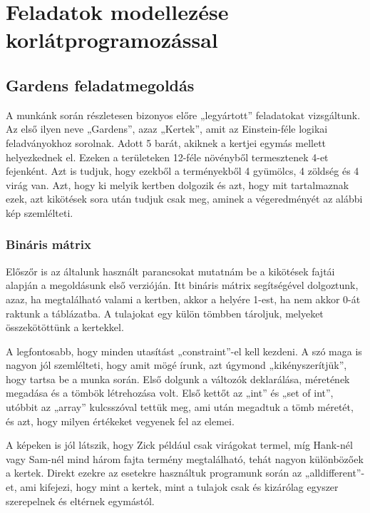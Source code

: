 \documentclass[12pt,a4paper,twoside, openright]{report}
\begin{document}
\chapter{Feladatok modellezése korlátprogramozással}

	\section{Gardens feladatmegoldás} 
		A munkánk során részletesen bizonyos előre „legyártott” feladatokat vizsgáltunk. Az első ilyen neve „Gardens”, azaz „Kertek”, amit az Einstein-féle logikai feladványokhoz sorolnak\cite{gardens}.
		Adott 5 barát, akiknek a kertjei egymás mellett helyezkednek el. Ezeken a területeken 12-féle növényből termesztenek 4-et fejenként. Azt is tudjuk, hogy ezekből a terményekből 4 gyümölcs, 4 zöldség és 4 virág van. Azt, hogy ki melyik kertben dolgozik és azt, hogy mit tartalmaznak ezek, azt kikötések sora után tudjuk csak meg, aminek a végeredményét az alábbi kép szemlélteti. 
		
		
			\subsection{Bináris mátrix}
				Előszőr is az általunk használt parancsokat mutatnám be a kikötések fajtái alapján a megoldásunk első verzióján. Itt bináris mátrix segítségével dolgoztunk, azaz, ha megtalálható valami a kertben, akkor a helyére 1-est, ha nem akkor 0-át raktunk a táblázatba. A tulajokat egy külön tömbben tároljuk, melyeket összekötöttünk a kertekkel.
				
				
				A legfontosabb, hogy minden utasítást „constraint”-el kell kezdeni. A szó maga is nagyon 
				jól szemlélteti, hogy amit mögé írunk, azt úgymond „kikényszerítjük”, hogy tartsa be a 
				munka során.
				Első dolgunk a változók deklarálása, méretének megadása és a tömbök létrehozása volt. 
				Első kettőt az „int” és „set of int”, utóbbit az „array” kulcsszóval tettük meg, ami után 
				megadtuk a tömb méretét, és azt, hogy milyen értékeket vegyenek fel az elemei.
				
				
				A képeken is jól látszik, hogy Zick például csak virágokat termel, míg Hank-nél vagy 
				Sam-nél mind három fajta termény megtalálható, tehát nagyon különbözőek a kertek. 
				Direkt ezekre az esetekre használtuk programunk során az „alldifferent”-et, ami kifejezi, 
				hogy mint a kertek, mint a tulajok csak és kizárólag egyszer szerepelnek és eltérnek 
				egymástól.
				
\end{document}
